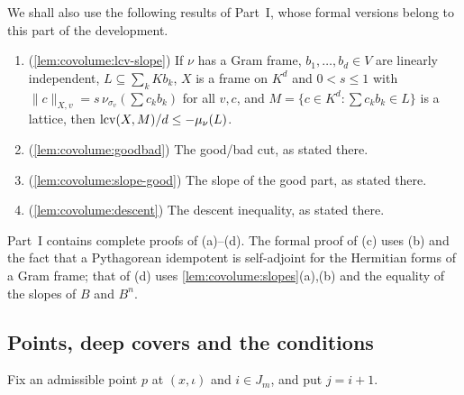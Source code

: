 We shall also use the following results of Part~I, whose formal versions belong to this part of the
development.

\begin{lemma}\label{pf:lift2:partI}
\begin{enumerate}[label=(\alph*)]
\item (\cref{lem:covolume:lcv-slope}) If $\nu$ has a Gram frame, $b_1,\dots,b_d\in V$ are linearly independent,
$L\subseteq\sum_kKb_k$, $X$ is a frame on $K^d$ and $0<s\le1$ with $\|c\|_{X,v}=s\,\nu_{\sigma_v}(\sum c_kb_k)$
for all $v,c$, and $M=\{c\in K^d:\sum c_kb_k\in L\}$ is a lattice, then $\operatorname{lcv}(X,M)/d\le-\mu_\nu(L)$.
\item (\cref{lem:covolume:goodbad}) The good/bad cut, as stated there.
\item (\cref{lem:covolume:slope-good}) The slope of the good part, as stated there.
\item (\cref{lem:covolume:descent}) The descent inequality, as stated there.
\end{enumerate}
\end{lemma}

Part~I contains complete proofs of (a)--(d). The formal proof of (c) uses (b) and the fact that a Pythagorean
idempotent is self-adjoint for the Hermitian forms of a Gram frame; that of (d) uses \cref{lem:covolume:slopes}(a),(b)
and the equality of the slopes of $B$ and $B^n$.

\subsection{Points, deep covers and the conditions}\label{sec:pf:lift2:objects}

Fix an admissible point $p$ at $(x,\iota)$ and $i\in J_m$, and put $j=i+1$.

